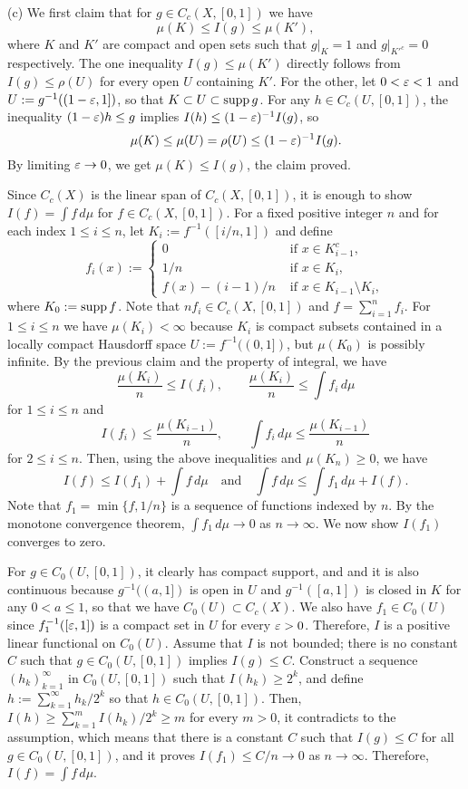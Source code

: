 \documentclass{../../large}
\begin{document}
\begin{pf}
(c)
We first claim that for $g\in C_c(X,[0,1])$ we have
\[\mu(K)\le I(g)\le\mu(K'),\]
where $K$ and $K'$ are compact and open sets such that $g|_K=1$ and $g|_{K'^c}=0$ respectively.
The one inequality $I(g)\le\mu(K')$ directly follows from $I(g)\le\rho(U)$ for every open $U$ containing $K'$.
For the other, let $0<\varepsilon<1$ and $U:=g^{-1}((1-\varepsilon,1])$, so that $K\subset U\subset\operatorname{supp} g$.
For any $h\in C_c(U,[0,1])$, the inequality $(1-\varepsilon)h\le g$ implies $I(h)\le(1-\varepsilon)^{-1}I(g)$, so
\[\mu(K)\le\mu(U)=\rho(U)\le(1-\varepsilon)^{-1}I(g).\]
By limiting $\varepsilon\to0$, we get $\mu(K)\le I(g)$, the claim proved.

Since $C_c(X)$ is the linear span of $C_c(X,[0,1])$, it is enough to show $I(f)=\int f\,d\mu$ for $f\in C_c(X,[0,1])$.
For a fixed positive integer $n$ and for each index $1\le i\le n$, let $K_i:=f^{-1}([i/n,1])$ and define
\[f_i(x):=\begin{cases}0&\text{ if }x\in K_{i-1}^c,\\1/n&\text{ if }x\in K_i,\\f(x)-(i-1)/n&\text{ if }x\in K_{i-1}\setminus K_i,\end{cases}\]
where $K_0:=\operatorname{supp} f$.
Note that $nf_i\in C_c(X,[0,1])$ and $f=\sum_{i=1}^nf_i$.
For $1\le i\le n$ we have $\mu(K_i)<\infty$ because $K_i$ is compact subsets contained in a locally compact Hausdorff space $U:=f^{-1}((0,1])$, but $\mu(K_0)$ is possibly infinite.
By the previous claim and the property of integral, we have
\[\frac{\mu(K_i)}n\le I(f_i),\qquad\frac{\mu(K_i)}n\le\int f_i\,d\mu\]
for $1\le i\le n$ and
\[I(f_i)\le\frac{\mu(K_{i-1})}n,\qquad\int f_i\,d\mu\le\frac{\mu(K_{i-1})}n\]
for $2\le i\le n$.
Then, using the above inequalities and $\mu(K_n)\ge0$, we have
\[I(f)\le I(f_1)+\int f\,d\mu\quad\text{and}\quad\int f\,d\mu\le\int f_1\,d\mu+I(f).\]
Note that $f_1=\min\{f,1/n\}$ is a sequence of functions indexed by $n$.
By the monotone convergence theorem, $\int f_1\,d\mu\to0$ as $n\to\infty$.
We now show $I(f_1)$ converges to zero.

For $g\in C_0(U,[0,1])$, it clearly has compact support, and and it is also continuous because $g^{-1}((a,1])$ is open in $U$ and $g^{-1}([a,1])$ is closed in $K$ for any $0<a\le1$, so that we have $C_0(U)\subset C_c(X)$.
We also have $f_1\in C_0(U)$ since $f_1^{-1}([\varepsilon,1])$ is a compact set in $U$ for every $\varepsilon>0$.
Therefore, $I$ is a positive linear functional on $C_0(U)$.
Assume that $I$ is not bounded; there is no constant $C$ such that $g\in C_0(U,[0,1])$ implies $I(g)\le C$.
Construct a sequence $(h_k)_{k=1}^\infty$ in $C_0(U,[0,1])$ such that $I(h_k)\ge2^k$, and define $h:=\sum_{k=1}^\infty h_k/2^k$ so that $h\in C_0(U,[0,1])$.
Then, $I(h)\ge \sum_{k=1}^mI(h_k)/2^k\ge m$ for every $m>0$, it contradicts to the assumption, which means that there is a constant $C$ such that $I(g)\le C$ for all $g\in C_0(U,[0,1])$, and it proves $I(f_1)\le C/n\to0$ as $n\to\infty$.
Therefore, $I(f)=\int f\,d\mu$.
\end{pf}
\end{document}
